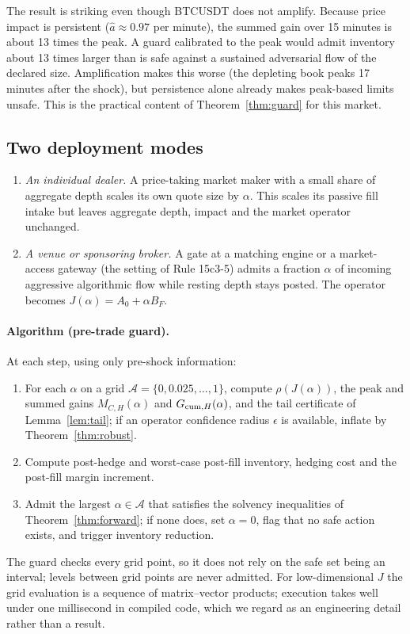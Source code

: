 The result is striking even though BTCUSDT does not amplify. Because price impact is persistent ($\hat a\approx0.97$ per minute), the summed gain over 15 minutes is about 13 times the peak. A guard calibrated to the peak would admit inventory about 13 times larger than is safe against a sustained adversarial flow of the declared size. Amplification makes this worse (the depleting book peaks 17 minutes after the shock), but persistence alone already makes peak-based limits unsafe. This is the practical content of Theorem~\ref{thm:guard} for this market.

\subsection{Two deployment modes}

\begin{enumerate}[label=\textbf{Mode \Alph*.},leftmargin=*]
\item \emph{An individual dealer.} A price-taking market maker with a small share of aggregate depth scales its own quote size by $\alpha$. This scales its passive fill intake but leaves aggregate depth, impact and the market operator unchanged.
\item \emph{A venue or sponsoring broker.} A gate at a matching engine or a market-access gateway (the setting of Rule 15c3-5) admits a fraction $\alpha$ of incoming aggressive algorithmic flow while resting depth stays posted. The operator becomes $J(\alpha)=A_0+\alpha B_F$.
\end{enumerate}

\paragraph{Algorithm (pre-trade guard).} At each step, using only pre-shock information:
\begin{enumerate}[itemsep=1pt]
\item For each $\alpha$ on a grid $\mathcal A=\{0,0.025,\ldots,1\}$, compute $\rho(J(\alpha))$, the peak and summed gains $M_{C,H}(\alpha)$ and $G_{{\rm cum},H}(\alpha)$, and the tail certificate of Lemma~\ref{lem:tail}; if an operator confidence radius $\epsilon$ is available, inflate by Theorem~\ref{thm:robust}.
\item Compute post-hedge and worst-case post-fill inventory, hedging cost and the post-fill margin increment.
\item Admit the largest $\alpha\in\mathcal A$ that satisfies the solvency inequalities of Theorem~\ref{thm:forward}; if none does, set $\alpha=0$, flag that no safe action exists, and trigger inventory reduction.
\end{enumerate}
The guard checks every grid point, so it does not rely on the safe set being an interval; levels between grid points are never admitted. For low-dimensional $J$ the grid evaluation is a sequence of matrix--vector products; execution takes well under one millisecond in compiled code, which we regard as an engineering detail rather than a result.

